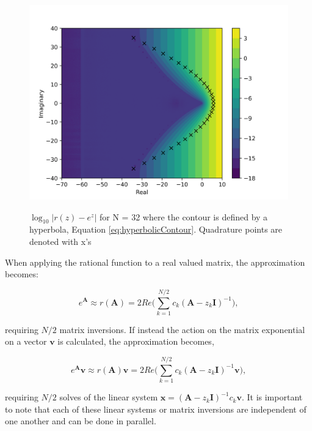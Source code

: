 \begin{figure}[p]
  \centering
  \includegraphics[width=5in]{images/chapter-3/RationApproxHyperbolicError32.png}\\
  \caption{$\log_{10}|r(z)-e^{z}|$ for N = 32 where the contour is defined by a hyperbola, Equation \ref{eq:hyperbolicContour}. Quadrature points are denoted with x's}
  \label{fig:complexRationalApproxHyperbola}
\end{figure} 

\clearpage

\noindent When applying the rational function to a real valued matrix, the approximation becomes:

\begin{equation}
    e^{\boldsymbol{A}} \approx r(\boldsymbol{A}) = 2Re\bigg(\sum_{k=1}^{N/2}c_{k}(\boldsymbol{A} - z_{k}\boldsymbol{I})^{-1}\bigg),
\end{equation}

\noindent requiring $N/2$ matrix inversions. If instead the action on the matrix exponential on a vector $\boldsymbol{v}$ is calculated, the approximation becomes,

\begin{equation}
    e^{\boldsymbol{A}}\boldsymbol{v} \approx r(\boldsymbol{A})\boldsymbol{v} = 2Re\bigg(\sum_{k=1}^{N/2}c_{k}(\boldsymbol{A} - z_{k}\boldsymbol{I})^{-1}\boldsymbol{v}\bigg),
\end{equation}

\noindent requiring $N/2$ solves of the linear system $\boldsymbol{x} = (\boldsymbol{A} - z_{k}\boldsymbol{I})^{-1}c_{k}\boldsymbol{v}$. It is important to note that each of these linear systems or matrix inversions are independent of one another and can be done in parallel. 

